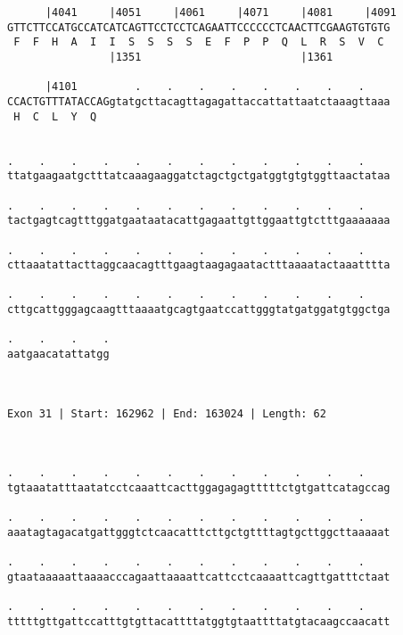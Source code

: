 \documentclass{article}
\begin{document}
\begin{Verbatim}
      |4041     |4051     |4061     |4071     |4081     |4091
GTTCTTCCATGCCATCATCAGTTCCTCCTCAGAATTCCCCCCTCAACTTCGAAGTGTGTG
 F  F  H  A  I  I  S  S  S  S  E  F  P  P  Q  L  R  S  V  C 
                |1351                         |1361         
  
      |4101         .    .    .    .    .    .    .    .    
CCACTGTTTATACCAGgtatgcttacagttagagattaccattattaatctaaagttaaa
 H  C  L  Y  Q                                              
                                                            
  
.    .    .    .    .    .    .    .    .    .    .    .    
ttatgaagaatgctttatcaaagaaggatctagctgctgatggtgtgtggttaactataa
                                                            
.    .    .    .    .    .    .    .    .    .    .    .    
tactgagtcagtttggatgaataatacattgagaattgttggaattgtctttgaaaaaaa
                                                            
.    .    .    .    .    .    .    .    .    .    .    .    
cttaaatattacttaggcaacagtttgaagtaagagaatactttaaaatactaaatttta
                                                            
.    .    .    .    .    .    .    .    .    .    .    .    
cttgcattgggagcaagtttaaaatgcagtgaatccattgggtatgatggatgtggctga
                                                            
.    .    .    .
aatgaacatattatgg
                
                
 
Exon 31 | Start: 162962 | End: 163024 | Length: 62



.    .    .    .    .    .    .    .    .    .    .    .    
tgtaaatatttaatatcctcaaattcacttggagagagtttttctgtgattcatagccag
                                                            
.    .    .    .    .    .    .    .    .    .    .    .    
aaatagtagacatgattgggtctcaacatttcttgctgttttagtgcttggcttaaaaat
                                                            
.    .    .    .    .    .    .    .    .    .    .    .    
gtaataaaaattaaaacccagaattaaaattcattcctcaaaattcagttgatttctaat
                                                            
.    .    .    .    .    .    .    .    .    .    .    .    
tttttgttgattccatttgtgttacattttatggtgtaattttatgtacaagccaacatt
                                                            

\end{Verbatim}
\end{document}
